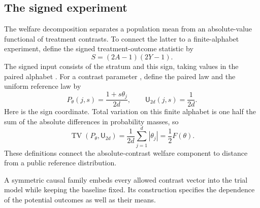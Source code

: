 \documentclass[11pt]{article}
\begin{document}
\subsection{The signed experiment}

The welfare decomposition separates a population mean from an absolute-value functional of treatment contrasts. To connect the latter to a finite-alphabet experiment, define the signed treatment-outcome statistic  by
\[
S=(2A-1)(2Y-1).
\]
The signed input consists of the stratum and this sign, taking values in the paired alphabet . For a contrast parameter , define the paired law  and the uniform reference law  by
\[
P_\theta(j,s)=\frac{1+s\theta_j}{2d},
\qquad
\mathsf U_{2d}(j,s)=\frac1{2d}.
\]
Here  is the sign coordinate. Total variation on this finite alphabet is one half the sum of the absolute differences in probability masses, so
\[
\operatorname{TV}(P_\theta,\mathsf U_{2d})
=\frac1{2d}\sum_{j=1}^d|\theta_j|
=\frac12F(\theta).
\]
These definitions connect the absolute-contrast welfare component to distance from a public reference distribution.

A symmetric causal family embeds every allowed contrast vector into the trial model while keeping the baseline fixed. Its construction specifies the dependence of the potential outcomes as well as their means.
\end{document}

